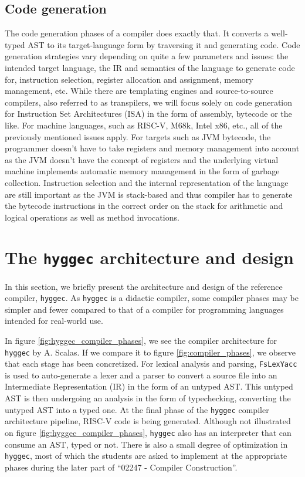 \subsection{Code generation}

The code generation phases of a compiler does exactly that. It converts a well-typed AST to its target-language form by traversing it and generating code.
Code generation strategies vary depending on quite a few parameters and issues: the intended target language, the IR and semantics of the language to generate code for,
instruction selection, register allocation and assignment, memory management, etc. While there are templating engines and source-to-source compilers,
also referred to as transpilers, we will focus solely on code generation for Instruction Set Architectures (ISA) in the form of assembly, bytecode or the like.
For machine languages, such as RISC-V, M68k, Intel x86, etc., all of the previously mentioned issues apply. For targets such as JVM bytecode, the programmer
doesn't have to take registers and memory management into account as the JVM doesn't have the concept of registers and the underlying virtual machine
implements automatic memory management in the form of garbage collection. Instruction selection and the internal representation of the language are still
important as the JVM is stack-based and thus compiler has to generate the bytecode instructions in the correct order on the stack for arithmetic and
logical operations as well as method invocations.

\section{The \texttt{hyggec} architecture and design}

In this section, we briefly present the architecture and design of the reference compiler, \texttt{hyggec}. As \texttt{hyggec} is a didactic compiler,
some compiler phases may be simpler and fewer compared to that of a compiler for programming languages intended for real-world use.

In figure \ref{fig:hyggec_compiler_phases}, we see the compiler architecture for \texttt{hyggec} by A. Scalas. If we compare it
to figure \ref{fig:compiler_phases}, we observe that each stage has been concretized. For lexical analysis and parsing, \texttt{FsLexYacc}
is used to auto-generate a lexer and a parser to convert a source file into an Intermediate Representation (IR) in the form of an untyped 
AST. This untyped AST is then undergoing an analysis in the form of typechecking, converting the untyped AST into a typed one. At the
final phase of the \texttt{hyggec} compiler architecture pipeline, RISC-V code is being generated. Although not illustrated on figure
\ref{fig:hyggec_compiler_phases}, \texttt{hyggec} also has an interpreter that can consume an AST, typed or not.
There is also a small degree of optimization in \texttt{hyggec}, most of which the students are asked to implement at the appropriate
phases during the later part of ``02247 - Compiler Construction''.

